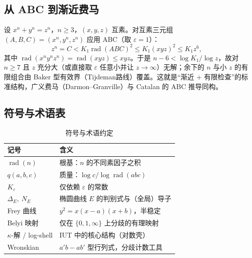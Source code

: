 \subsection{从 ABC 到渐近费马}\label{sec:app-fermat}

设 $x^n + y^n = z^n$，$n \geq 3$，$(x, y, z)$ 互素。对互素三元组 $(A, B, C) = (x^n, y^n, z^n)$ 应用 ABC（取 $\varepsilon = 1$）：
\begin{equation}
    z^n = C < K_1 \operatorname{rad}(ABC)^{2} \leq K_1 (xyz)^{2} \leq K_1 z^{6} ,
\end{equation}
其中 $\operatorname{rad}(x^n y^n z^n) = \operatorname{rad}(xyz) \leq xyz$。于是 $n - 6 < \log K_1 / \log z$，故对 $n \geq 7$ 且 $z$ 充分大（或直接取 $\varepsilon$ 任意小并让 $z \to \infty$）无解；余下的 $n$ 与小 $z$ 的有限组合由 Baker 型有效界（Tijdeman\cite{tijdeman1976}路线）覆盖。这就是“渐近 + 有限检查”的标准结构，广义费马（Darmon--Granville\cite{darmongranville1995}）与 Catalan 的 ABC 推导同构。

\subsection{符号与术语表}

\begin{table}[htbp]
    \centering
    \caption{符号与术语约定}
    \label{tab:notation}
    \begin{tabular}{ll}
        \toprule
        记号 & 含义 \\
        \midrule
        $\operatorname{rad}(n)$ & 根基：$n$ 的不同素因子之积 \\
        $q(a,b,c)$ & 质量：$\log c / \log \operatorname{rad}(abc)$ \\
        $K_\varepsilon$ & 仅依赖 $\varepsilon$ 的常数 \\
        $\Delta_E,\ N_E$ & 椭圆曲线 $E$ 的判别式与（全局）导子 \\
        Frey 曲线 & $y^2 = x(x-a)(x+b)$，半稳定 \\
        Belyi 映射 & 仅在 $\{0,1,\infty\}$ 上分歧的有理映射 \\
        $\kappa$-解 / log-shell & IUT 中的核心结构（对数壳） \\
        Wronskian & $a'b - ab'$ 型行列式，分歧计数工具 \\
        \bottomrule
    \end{tabular}
\end{table}
